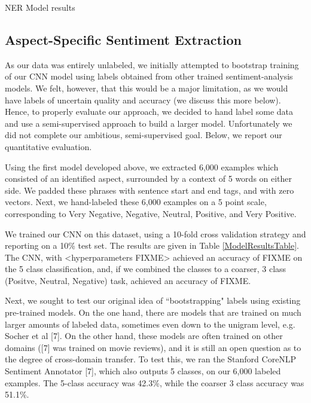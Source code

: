 \documentclass{article} %
\begin{document}
NER Model results


\subsection{Aspect-Specific Sentiment Extraction}



As our data was entirely unlabeled, we initially attempted to bootstrap training of our CNN model using labels obtained from other trained sentiment-analysis models. We felt, however, that this would be a major limitation, as we would have labels of uncertain quality and accuracy (we discuss this more below). Hence, to properly evaluate our approach, we decided to hand label some data and use a semi-supervised approach to build a larger model. Unfortunately we did not complete our ambitious, semi-supervised goal. Below, we report our quantitative evaluation.

Using the first model developed above, we extracted 6,000 examples which consisted of an identified aspect, surrounded by a context of 5 words on either side. We padded these phrases with sentence start and end tags, and with zero vectors. Next, we hand-labeled these 6,000 examples on a 5 point scale, corresponding to Very Negative, Negative, Neutral, Positive, and Very Positive. 

We trained our CNN on this dataset, using a 10-fold cross validation strategy and reporting on a 10\% test set. The results are given in Table \ref{ModelResultsTable}. The CNN, with <hyperparameters FIXME> achieved an accuracy of FIXME on the 5 class classification, and, if we combined the classes to a coarser, 3 class (Positve, Neutral, Negative) task, achieved an accuracy of FIXME.

Next, we sought to test our original idea of ``bootstrapping" labels using existing pre-trained models. On the one hand, there are models that are trained on much larger amounts of labeled data, sometimes even down to the unigram level, e.g. Socher et al [7]. On the other hand, these models are often trained on other domains ([7] was trained on movie reviews), and it is still an open question as to the degree of cross-domain transfer. To test this, we ran the Stanford CoreNLP Sentiment Annotator [7], which also outputs 5 classes, on our 6,000 labeled examples. The 5-class accuracy was 42.3\%, while the coarser 3 class accuracy was 51.1\%.
\end{document}
